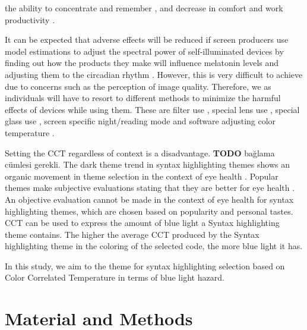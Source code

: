 \documentclass{article}
\begin{document}
the ability to concentrate and remember \cite{cohen2011}, and decrease in comfort and work productivity \cite{conlon1998, kurimoto1986, anshel2007, stoner2002}. 

It can be expected that adverse effects will be reduced if screen producers use model estimations to adjust the spectral power of self-illuminated devices by finding out how the products they make will influence melatonin levels and adjusting them to the circadian rhythm \cite{wood2012}. However, this is very difficult to achieve due to concerns such as the perception of image quality. Therefore, we as individuals will have to resort to different methods to minimize the harmful effects of devices while using them. These are filter use \cite{mortazavi2018, heiting2020}, special lens use \cite{sano2014}, special glass use \cite{heiting2020, lely2014}, screen specific night/reading mode \cite{sanz2020, teran2020} and software adjusting color temperature \cite{sanz2020}.
 
Setting the CCT regardless of context is a disadvantage. \textbf{TODO} bağlama cümlesi gerekli. The dark theme trend in syntax highlighting themes shows an organic movement in theme selection in the context of eye health \cite{suraj2020dark, coyier2013poll}. Popular themes make subjective evaluations stating that they are better for eye health \cite{}. An objective evaluation cannot be made in the context of eye health for syntax highlighting themes, which are chosen based on popularity and personal tastes. CCT can be used to express the amount of blue light a Syntax highlighting theme contains. The higher the average CCT produced by the Syntax highlighting theme in the coloring of the selected code, the more blue light it has. 

In this study, we aim to the theme for syntax highlighting selection based on Color Correlated Temperature in terms of blue light hazard.

\section{Material and Methods} \label{sec:material-methods}
\end{document}
